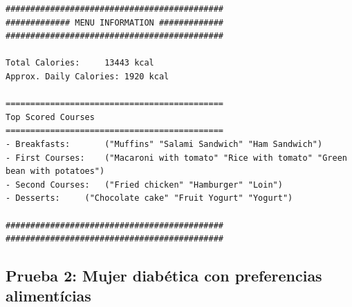 \documentclass[11]{article}
\begin{document}
\begin{lstlisting}[frame=single]
############################################
############# MENU INFORMATION #############
############################################

Total Calories:		13443 kcal
Approx. Daily Calories:	1920 kcal

============================================
Top Scored Courses
============================================
- Breakfasts:		("Muffins" "Salami Sandwich" "Ham Sandwich")
- First Courses:	("Macaroni with tomato" "Rice with tomato" "Green bean with potatoes")
- Second Courses:	("Fried chicken" "Hamburger" "Loin")
- Desserts:		("Chocolate cake" "Fruit Yogurt" "Yogurt")

############################################
############################################
\end{lstlisting}

\subsection{Prueba 2: Mujer diabética con preferencias alimentícias}
\end{document}
